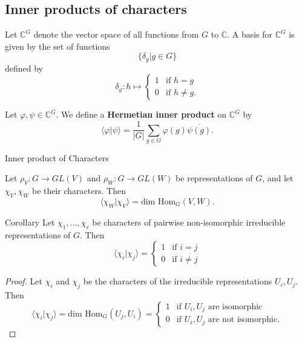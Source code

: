 \subsection{Inner products of characters}
\begin{frame}
\begin{definition}
Let $\mathbb{C}^G$ denote the vector space of all functions from $G$ to $\mathbb{C}$.
A basis for $\mathbb{C}^G$ is given by the set of functions 
\[\{ \delta_g | g \in G  \} \]
defined by 
\[ \delta_g \colon h \mapsto \begin{cases}  1 &\text{if } h = g \\
 0 &\text{if } h \neq g.
\end{cases} \]
\end{definition}
\begin{definition}
Let $\varphi, \psi \in \mathbb{C}^G$.  We define a \textbf{Hermetian inner product}  on $\mathbb{C}^G$ by 
\[ \langle \varphi | \psi \rangle = \frac{1}{|G|} \sum_{g \in G} \varphi(g) \overline{\psi(g)}.\]
\end{definition}
\end{frame}

\begin{frame}{Inner product of Characters}
\begin{theorem}
Let $\rho_V \colon G \to GL(V)$ and $\rho_W \colon G \to GL(W)$ be representations of $G$, and let $\chi_V, \chi_W$ be their characters.  Then 
\[ \langle \chi_W | \chi_V \rangle = \text{dim Hom}_G (V,W). \]
\end{theorem}
\end{frame}

\begin{frame}
\begin{block}{Corollary}
Let $\chi_1, \ldots, \chi_r$ be characters of pairwise non-isomorphic irreducible representations of $G$.  Then
\[ \langle \chi_i | \chi_j \rangle = \begin{cases}  1 &\text{if } i = j \\ 0 &\text{if } i \neq j\end{cases} \]
\end{block}
\begin{proof}
Let $\chi_i$ and $\chi_j$ be the characters of the irreducible representations $U_i, U_j$.  Then
\[ \langle \chi_i | \chi_j \rangle = \text{dim Hom}_G (U_j, U_i) = \begin{cases}  1 &\text{if }U_i, U_j \text{ are isomorphic} \\  0 &\text{if }U_i, U_j \text{ are not isomorphic}. \end{cases} \]
\end{proof}
\end{frame}

